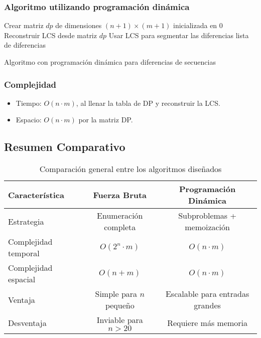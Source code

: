 \subsubsection{Algoritmo utilizando programación dinámica}

\begin{algorithm}[H]
\SetAlgoLined
{}
Crear matriz $dp$ de dimensiones $(n+1) \times (m+1)$ inicializada en 0\;
Reconstruir LCS desde matriz $dp$\;
Usar LCS para segmentar las diferencias\;
\Return lista de diferencias
\caption{Algoritmo con programaci\'on din\'amica para diferencias de secuencias}
\end{algorithm}

\subsubsection*{Complejidad}
\begin{itemize}
  \item Tiempo: \( O(n \cdot m) \), al llenar la tabla de DP y reconstruir la LCS.
  \item Espacio: \( O(n \cdot m) \) por la matriz DP.
\end{itemize}

\subsection*{Resumen Comparativo}

\begin{table}[H]
\centering
\begin{tabular}{|l|c|c|}
\hline
\textbf{Caracter\'istica} & \textbf{Fuerza Bruta} & \textbf{Programaci\'on Din\'amica} \\
\hline
Estrategia & Enumeraci\'on completa & Subproblemas + memoizaci\'on \\
\hline
Complejidad temporal & $O(2^n \cdot m)$ & $O(n \cdot m)$ \\
\hline
Complejidad espacial & $O(n + m)$ & $O(n \cdot m)$ \\
\hline
Ventaja & Simple para $n$ peque\~no & Escalable para entradas grandes \\
\hline
Desventaja & Inviable para $n > 20$ & Requiere m\'as memoria \\
\hline
\end{tabular}
\caption{Comparaci\'on general entre los algoritmos dise\~nados}
\end{table}
